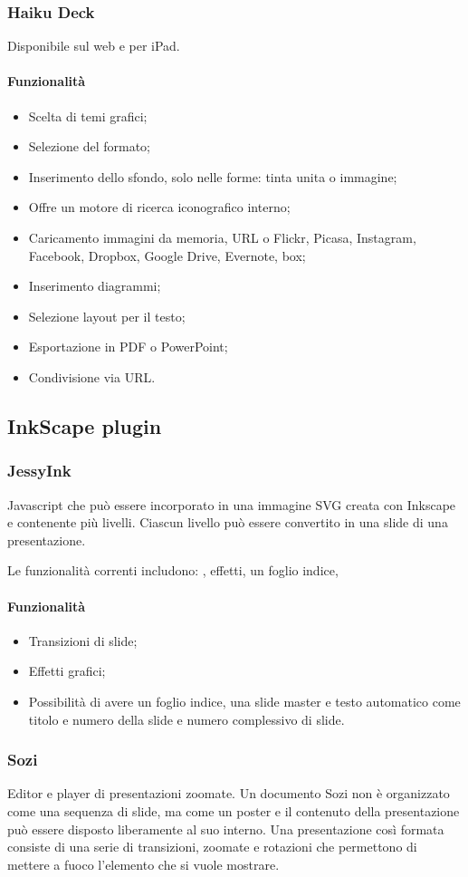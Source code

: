 \subsubsection{Haiku Deck}
Disponibile sul web e per iPad.
\paragraph{Funzionalità}
\begin{itemize}
 \item Scelta di temi grafici;
 \item Selezione del formato;
 \item Inserimento dello sfondo, solo nelle forme: tinta unita o immagine; 
 \item Offre un motore di ricerca iconografico interno; 
 \item Caricamento immagini da memoria, URL o Flickr, Picasa, Instagram, Facebook, Dropbox, Google Drive, Evernote, box;
 \item Inserimento diagrammi;
 \item Selezione layout per il testo;
 \item Esportazione in PDF o PowerPoint;
 \item Condivisione via URL.
\end{itemize}
\subsection{InkScape plugin}
\subsubsection{JessyInk}
Javascript che può essere incorporato in una immagine SVG creata con Inkscape e contenente più livelli. 
Ciascun livello può essere convertito in una slide di una presentazione. 

Le funzionalità correnti includono: , effetti, un foglio indice, 
\paragraph{Funzionalità}
\begin{itemize}
\item Transizioni di slide;
\item Effetti grafici;
\item Possibilità di avere un foglio indice, una slide master e testo automatico come titolo e numero della slide e numero complessivo di slide. 
\end{itemize}
\subsubsection{Sozi}
Editor e player di presentazioni zoomate.
Un documento Sozi non è organizzato come una sequenza di slide, ma come un poster 
e il contenuto della presentazione può essere disposto liberamente al suo interno.
Una presentazione così formata consiste di una serie di transizioni, zoomate e rotazioni 
che permettono di mettere a fuoco l'elemento che si vuole mostrare.


